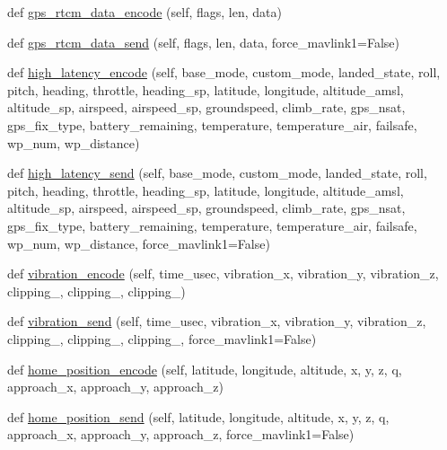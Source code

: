 \begin{DoxyCompactItemize}
\item 
def \hyperlink{classpymavlink_1_1dialects_1_1v10_1_1MAVLink_a72398ef90750f1e2b535b9a8e75bbfd8}{gps\+\_\+rtcm\+\_\+data\+\_\+encode} (self, flags, len, data)
\item 
def \hyperlink{classpymavlink_1_1dialects_1_1v10_1_1MAVLink_ac6a2da6afa8b009a42a3ba5cd693384d}{gps\+\_\+rtcm\+\_\+data\+\_\+send} (self, flags, len, data, force\+\_\+mavlink1=False)
\item 
def \hyperlink{classpymavlink_1_1dialects_1_1v10_1_1MAVLink_a0b32dabfb993c6a0717c17f759e73c92}{high\+\_\+latency\+\_\+encode} (self, base\+\_\+mode, custom\+\_\+mode, landed\+\_\+state, roll, pitch, heading, throttle, heading\+\_\+sp, latitude, longitude, altitude\+\_\+amsl, altitude\+\_\+sp, airspeed, airspeed\+\_\+sp, groundspeed, climb\+\_\+rate, gps\+\_\+nsat, gps\+\_\+fix\+\_\+type, battery\+\_\+remaining, temperature, temperature\+\_\+air, failsafe, wp\+\_\+num, wp\+\_\+distance)
\item 
def \hyperlink{classpymavlink_1_1dialects_1_1v10_1_1MAVLink_a3b0d40fb21b814adb06fad96941c18ee}{high\+\_\+latency\+\_\+send} (self, base\+\_\+mode, custom\+\_\+mode, landed\+\_\+state, roll, pitch, heading, throttle, heading\+\_\+sp, latitude, longitude, altitude\+\_\+amsl, altitude\+\_\+sp, airspeed, airspeed\+\_\+sp, groundspeed, climb\+\_\+rate, gps\+\_\+nsat, gps\+\_\+fix\+\_\+type, battery\+\_\+remaining, temperature, temperature\+\_\+air, failsafe, wp\+\_\+num, wp\+\_\+distance, force\+\_\+mavlink1=False)
\item 
def \hyperlink{classpymavlink_1_1dialects_1_1v10_1_1MAVLink_ae9d5716d53ff7e3316cb9b60859b6401}{vibration\+\_\+encode} (self, time\+\_\+usec, vibration\+\_\+x, vibration\+\_\+y, vibration\+\_\+z, clipping\+\_, clipping\+\_, clipping\+\_)
\item 
def \hyperlink{classpymavlink_1_1dialects_1_1v10_1_1MAVLink_a85527943a237f509e36e26a2cb228ab0}{vibration\+\_\+send} (self, time\+\_\+usec, vibration\+\_\+x, vibration\+\_\+y, vibration\+\_\+z, clipping\+\_, clipping\+\_, clipping\+\_, force\+\_\+mavlink1=False)
\item 
def \hyperlink{classpymavlink_1_1dialects_1_1v10_1_1MAVLink_abe5d8c80bd6a304864a774081225b960}{home\+\_\+position\+\_\+encode} (self, latitude, longitude, altitude, x, y, z, q, approach\+\_\+x, approach\+\_\+y, approach\+\_\+z)
\item 
def \hyperlink{classpymavlink_1_1dialects_1_1v10_1_1MAVLink_aeb75c2ce72cdbef5899ab52051a323d2}{home\+\_\+position\+\_\+send} (self, latitude, longitude, altitude, x, y, z, q, approach\+\_\+x, approach\+\_\+y, approach\+\_\+z, force\+\_\+mavlink1=False)

\end{DoxyCompactItemize}

